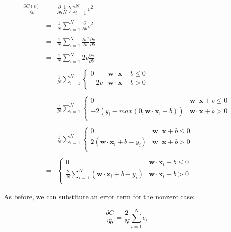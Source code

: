 \documentclass[11pt]{article}
\begin{document}
\allowdisplaybreaks
\begin{eqnarray*}
\frac{\partial C(v)}{\partial b} & = & \frac{\partial }{\partial b}\frac{1}{N} \sum_{i=1}^N v^2\\\\
 & = & \frac{1}{N} \sum_{i=1}^N \frac{\partial}{\partial b} v^2\\\\
 & = & \frac{1}{N} \sum_{i=1}^N \frac{\partial v^2}{\partial v} \frac{\partial v}{\partial b} \\\\
 & = & \frac{1}{N} \sum_{i=1}^N 2v \frac{\partial v}{\partial b} \\\\
 & = & \frac{1}{N} \sum_{i=1}^N \begin{cases}
 	0 & \mathbf{w} \cdot \mathbf{x} + b \leq 0\\
 	-2v & \mathbf{w} \cdot \mathbf{x} + b > 0\\
 \end{cases}\\\\
 & = & \frac{1}{N} \sum_{i=1}^N \begin{cases}
 	0 & \mathbf{w} \cdot \mathbf{x} + b \leq 0\\
 	-2(y_i-max(0, \mathbf{w}\cdot\mathbf{x}_i+b)) & \mathbf{w} \cdot \mathbf{x} + b > 0\\
 \end{cases}\\\\
 & = & \frac{1}{N} \sum_{i=1}^N \begin{cases}
 	0 & \mathbf{w} \cdot \mathbf{x} + b \leq 0\\
 	2(\mathbf{w}\cdot\mathbf{x}_i+b-y_i) & \mathbf{w} \cdot \mathbf{x} + b > 0\\
 \end{cases}\\\\
 & = & \begin{cases}
	0 & \mathbf{w} \cdot \mathbf{x}_i + b \leq 0\\
	\frac{2}{N} \sum_{i=1}^N (\mathbf{w}\cdot\mathbf{x}_i+b-y_i) & \mathbf{w} \cdot \mathbf{x}_i + b > 0\\
\end{cases}
\end{eqnarray*}

As before, we can substitute an error term for the nonzero case:

\[
\frac{\partial C}{\partial b} = \frac{2}{N} \sum_{i=1}^N e_i
\]
\end{document}
